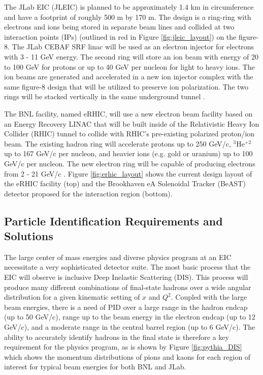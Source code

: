 The JLab EIC (JLEIC) is planned to be approximately 1.4 km in circumference and have a footprint of roughly 500 m by 170 m. The design is a ring-ring with electrons and ions being stored in separate beam lines and collided at two interaction points  (IPs) (outlined in red in Figure \ref{fig:jleic_layout}) on the figure-8. The JLab CEBAF SRF linac will be used as an electron injector for electrons with 3 - 11 GeV energy. The second ring will store an ion beam with energy of 20 to 100 GeV for protons or up to 40 GeV per nucleon for light to heavy ions. The ion beams are generated and accelerated in a new ion injector complex with the same figure-8 design that will be utilized to preserve ion polarization. The two rings will be stacked vertically in the same underground tunnel \cite{JLEICdesign}.

The BNL facility, named eRHIC, will use a new electron beam facility based on an Energy Recovery LINAC that will be built inside of the Relativistic Heavy Ion Collider (RHIC) tunnel to collide with RHIC's pre-existing polarized proton/ion beam. The existing hadron ring will accelerate protons up to 250 GeV/c, $^3$He$^{+2}$ up to 167 GeV/c per nucleon, and heavier ions (e.g. gold or uranium) up to 100 GeV/c per nucleon. The new electron ring will be capable of producing electrons from 2 - 21 GeV/c \cite{eRHICdesign}. Figure \ref{fig:erhic_layout} shows the current design layout of the eRHIC facility (top) and the Brookhaven eA Solenoidal Tracker (BeAST) detector proposed for the interaction region (bottom).

\subsection{Particle Identification Requirements and Solutions}
The large center of mass energies and diverse physics program at an EIC necessitate a very sophisticated detector suite. The most basic process that the EIC will observe is inclusive Deep Inelastic Scattering (DIS). This process will produce many different combinations of final-state hadrons over a wide angular distribution for a given kinematic setting of $x$ and $Q^2$. Coupled with the large beam energies, there is a need of PID over a large range in the hadron endcap (up to 50 GeV/c), range up to the beam energy in the electron endcap (up to 12 GeV/c), and a moderate range in the central barrel region (up to 6 GeV/c). The ability to accurately identify hadrons in the final state is therefore a key requirement for the physics program, as is shown by Figure \ref{fig:pythia_DIS} which shows the momentum distributions of pions and kaons for each region of interest for typical beam energies for both BNL and JLab.


